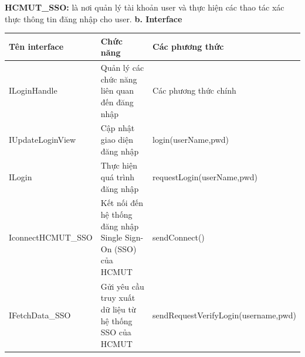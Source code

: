 \documentclass[a4paper]{article}
\begin{document}
\textbf{HCMUT\_SSO:} là nơi quản lý tài khoản user và thực hiện các thao tác xác thực thông tin đăng nhập cho user.
\newpage
\noindent \textbf{b. Interface}
\begin{table}[h!]
\centering
\begin{tabular}{|M{4cm}|p{5cm}|p{6.5cm}|}
\hline
\textbf{Tên interface} & \textbf{Chức năng} & \textbf{Các phương thức} \\
\hline
ILoginHandle &Quản lý các chức năng liên quan đến đăng nhập  & Các phương thức chính \\
\hline
IUpdateLoginView & Cập nhật giao diện đăng nhập & login(userName,pwd) \\
\hline
ILogin & Thực hiện quá trình đăng nhập & requestLogin(userName,pwd) \\
\hline
IconnectHCMUT\_SSO & Kết nối đến hệ thống đăng nhập Single Sign-On (SSO) của HCMUT & sendConnect()\\
\hline
IFetchData\_SSO & Gửi yêu cầu truy xuất dữ liệu từ hệ thống SSO của HCMUT & sendRequestVerifyLogin(username,pwd)\\
\hline
\end{tabular}
\end{table}
\end{document}
